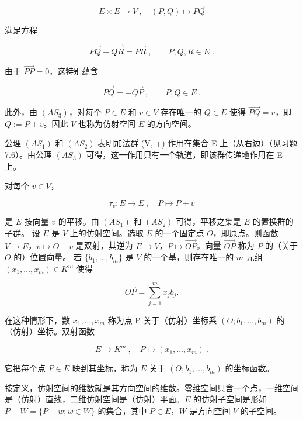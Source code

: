 \[
E\times E\to V~,\quad(P,Q)\mapsto\overrightarrow{P Q}
\]

满足方程

\[
\overrightarrow{P Q}+\overrightarrow{Q R}=\overrightarrow{P R}\;,\qquad P,Q,R\in E\;.
\]

由于  $ \overrightarrow{PP}=0 $，这特别蕴含

\[
\overrightarrow{P Q}=-\overrightarrow{Q P}~,\qquad P,Q\in E~.
\]

此外，由 $(AS_3)$，对每个 $P \in E$ 和 $v \in V$ 存在唯一的 $Q \in E$ 使得 $\overrightarrow{PQ} = v$，即 $Q := P + v$。因此 $V$ 也称为仿射空间 $E$ 的方向空间。

\begin{remark}

\begin{items}
\item

公理 $ (AS_{1}) $ 和 $ (AS_{2}) $ 表明加法群 (V, +) 作用在集合 E 上（从右边）（见习题 7.6）。由公理 $ (AS_{3}) $ 可得，这一作用只有一个轨道，即该群传递地作用在 E 上。

\item

对每个  $ v \in V $，

\[
\tau_{v}\colon E\to E~,\quad P\mapsto P+v
\]

是 $E$ 按向量 $v$ 的平移。由 $(AS_1)$ 和 $(AS_2)$ 可得，平移之集是 $E$ 的置换群的子群。
设 $E$ 是 $V$ 上的仿射空间。选取 $E$ 的一个固定点 $O$，即$\text{原点}$。则函数 $V \to E$，$v \mapsto O + v$ 是双射，其逆为 $E \to V$，$P \mapsto \overrightarrow{OP}$。向量 $\overrightarrow{OP}$ 称为 $P$ 的（关于 $O$ 的）位置向量。
若 $\{b_1, \ldots, b_m\}$ 是 $V$ 的一个基，则存在唯一的 $m$ 元组 $(x_1, \ldots, x_m) \in K^m$ 使得

\[
\overrightarrow{OP}=\sum_{j=1}^{m}x_{j}b_{j}.
\]

在这种情形下，数  $ x_{1}, \ldots, x_{m} $ 称为点 P 关于（仿射）坐标系  $ (O; b_{1}, \ldots, b_{m}) $ 的（仿射）坐标。双射函数

\end{items}

\begin{equation}
E\to K^{m}~,\quad P\mapsto(x_{1},\ldots,x_{m})~.
\end{equation}

它把每个点  $ P \in E $ 映到其坐标，称为  $ E $ 关于  $ (O; b_1, \ldots, b_m) $ 的坐标函数。

按定义，仿射空间的维数就是其方向空间的维数。零维空间只含一个点，一维空间是（仿射）直线，二维仿射空间是（仿射）平面。$E$ 的仿射子空间是形如 $P + W = \{P + w; w \in W\}$ 的集合，其中 $P \in E$，$W$ 是方向空间 $V$ 的子空间。

\end{remark}

